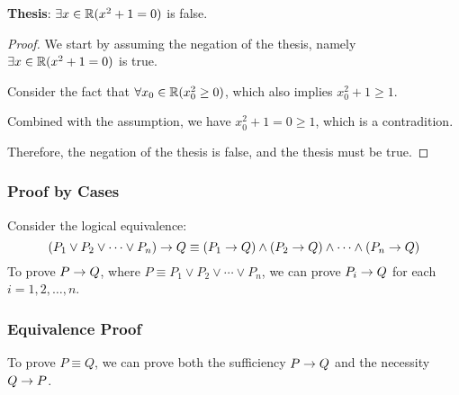 \begin{example} \quad\par
    \textbf{Thesis}: $\exists x \in \mathbb{R} (x^2 + 1 = 0)$ is false.

    \begin{proof}
        We start by assuming the negation of the thesis, namely
        $\exists x \in \mathbb{R} (x^2 + 1 = 0)$ is true.

        Consider the fact that $\forall x_0 \in \mathbb{R} (x_0^2 \ge 0)$, which also implies
        $x_0^2 + 1 \ge 1$.

        Combined with the assumption, we have $x_0^2 + 1 = 0 \ge 1$, which is a contradition.

        Therefore, the negation of the thesis is false, and the thesis must be true.
    \end{proof}
\end{example}

\subsubsection{Proof by Cases}

Consider the logical equivalence:
$$
(P_1 \lor P_2 \lor \cdots \lor P_n) \rightarrow Q \equiv (P_1 \rightarrow Q) \land (P_2 \rightarrow Q) \land \cdots \land (P_n \rightarrow Q)
$$
To prove $P \rightarrow Q$, where $P \equiv P_1 \lor P_2 \lor \cdots \lor P_n$, we can prove
$P_i \rightarrow Q$ for each $i=1, 2, \ldots, n$.

\subsubsection{Equivalence Proof}

To prove $P \equiv Q$, we can prove both the sufficiency $P \rightarrow Q$ and the necessity
$Q \rightarrow P$.